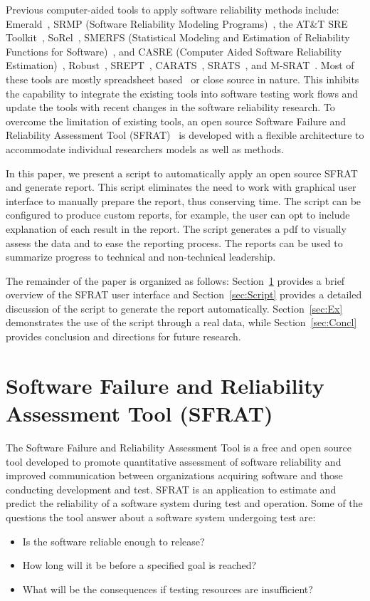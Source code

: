 \documentclass[conference]{IEEEtran}
\begin{document}
Previous computer-aided tools to apply software reliability methods include: Emerald~\cite{1996hudepohlemerald}, SRMP (Software Reliability Modeling Programs)~\cite{1988SRMP}, the AT\&T SRE Toolkit~\cite{1990ATT}, SoRel~\cite{1993kanounsorel}, SMERFS (Statistical Modeling and Estimation of Reliability Functions for Software)~\cite{trSMERFS}, and CASRE (Computer Aided Software Reliability Estimation)~\cite{lyu1992casre}, Robust~\cite{1995lirobust}, SREPT~\cite{2000ramanisrept}, CARATS~\cite{2011huangestimation}, SRATS~\cite{inProcISSRE2013_100}, and M-SRAT~\cite{2015shibatam}. Most of these tools are mostly spreadsheet based~\cite{inProcISSRE2013_100} or close source in nature. This inhibits the capability to integrate the existing tools into software testing work flows and update the tools with recent changes in the software reliability research. To overcome the limitation of existing tools, an open source Software Failure and Reliability Assessment Tool (SFRAT)~\cite{cFio53} is developed with a flexible architecture to accommodate individual researchers models as well as methods.

In this paper, we present a script to automatically apply an open source SFRAT and generate report. This script eliminates the need to work with graphical user interface to manually prepare the report, thus conserving time. The script can be configured to produce custom reports, for example, the user can opt to include explanation of each result in the report. The script generates a pdf to visually assess the data and to ease the reporting process. The reports can be used to summarize progress to technical and non-technical leadership.

The remainder of the paper is organized as follows: Section~\ref{sec:SFRAT} provides a brief overview of the SFRAT user interface and Section~\ref{sec:Script} provides a detailed discussion of the script to generate the report automatically. Section~\ref{sec:Ex} demonstrates the use of the script through a real data, while Section~\ref{sec:Concl} provides conclusion and directions for future research.


\section{Software Failure and Reliability Assessment Tool (SFRAT)}\label{sec:SFRAT}
The Software Failure and Reliability Assessment Tool is a free and open source tool developed to promote quantitative assessment of software reliability and improved communication between organizations acquiring software and those conducting development and test. SFRAT is an application to estimate and predict the reliability of a software system during test and operation. Some of the questions the tool answer about a software system undergoing test are:
\begin{itemize}
\item {Is the software reliable enough to release?}
\item {How long will it be before a specified goal is reached?}
\item {What will be the consequences if testing resources are insufficient?}
\end{itemize}
\end{document}
